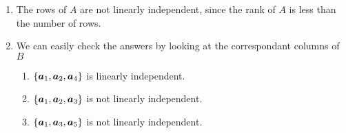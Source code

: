 \documentclass{report}
\begin{document}
{\begin{enumerate}[label=(\alph*)]
              \( \therefore \mrC (A) = \mathrm{span}(S_C)\), where \[
                  S_C = \left\{
                  \begin{bmatrix}
                      -2 \\
                      1  \\
                      3  \\
                      1  \\
                  \end{bmatrix},
                  \begin{bmatrix}
                      - 5 \\
                      3   \\
                      11  \\
                      7   \\
                  \end{bmatrix},
                  \begin{bmatrix}
                      0 \\
                      1 \\
                      7 \\
                      5
                  \end{bmatrix}
                  \right\}.
              \]
        \item The rows of \( A \) are not linearly independent, since the rank of \( A \) is
              less than the number of rows. \\
        \item We can easily check the answers by looking at the correspondant columns of \( B
              \)
              \begin{enumerate}[label=(\roman*)]
                  \item \( \{ \boldsymbol{a}_1, \boldsymbol{a}_2, \boldsymbol{a}_4 \} \) is linearly independent. \\
                  \item \( \{ \boldsymbol{a}_1, \boldsymbol{a}_2, \boldsymbol{a}_3 \} \) is not linearly independent. \\
                  \item \( \{ \boldsymbol{a}_1, \boldsymbol{a}_3, \boldsymbol{a}_5 \} \) is not linearly independent. \\
              \end{enumerate}
    \end{enumerate}
}

\end{document}
